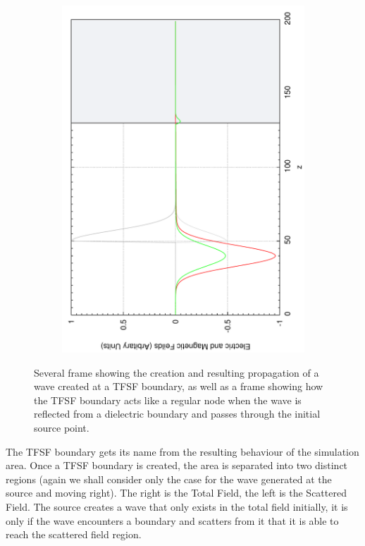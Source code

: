 \begin{figure}[ht]
\begin{subfigure}[ht]{0.45\textwidth}
                \includegraphics[angle=270, width=\textwidth]{TFSF2.pdf}
        \end{subfigure}
        \caption{Several frame showing the creation and resulting propagation of a wave created at a TFSF boundary, as well as a frame showing how the TFSF boundary acts like a regular node when the wave is reflected from a dielectric boundary and passes through the initial source point.}\label{fig:TFSF}
\end{figure}

The TFSF boundary gets its name from the resulting behaviour of the simulation area. Once a TFSF boundary is created, the area is separated into two distinct regions (again we shall consider only the case for the wave generated at the source and moving right). The right is the Total Field, the left is the Scattered Field. The source creates a wave that only exists in the total field initially, it is only if the wave encounters a boundary and scatters from it that it is able to reach the scattered field region.



